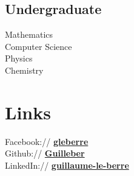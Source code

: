 \documentclass[]{deedy-resume-openfont}
\begin{document}
\begin{minipage}[t]{0.33\textwidth}
\subsection{Undergraduate}
Mathematics \\
Computer Science \\
Physics \\
Chemistry \\


\section{Links} 
Facebook:// \href{https://facebook/gleberre}{\bf gleberre} \\
Github:// \href{https://github.com/Guilleber}{\bf Guilleber} \\
LinkedIn://  \href{https://www.linkedin.com/in/guillaume-le-berre}{\bf guillaume-le-berre} \\

%
%

\end{minipage} 
\hfill
\end{document}
